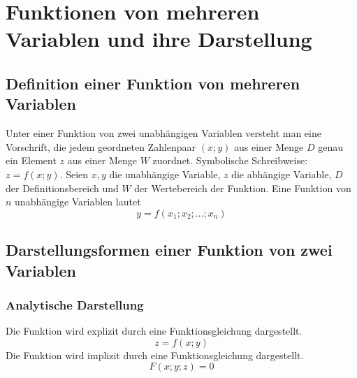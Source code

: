 \section{Funktionen von mehreren Variablen und ihre Darstellung}
\subsection{Definition einer Funktion von mehreren Variablen}
Unter einer Funktion von zwei unabhängigen Variablen versteht man eine Vorschrift, die jedem geordneten Zahlenpaar $\left(x;y\right)$ aus einer Menge $D$ genau ein Element $z$ aus einer Menge $W$ zuordnet. Symbolische Schreibweise: $z=f\left(x;y\right)$.
\newline\newline
Seien $x,y$ die unabhängige Variable, $z$ die abhängige Variable, $D$ der Definitionsbereich und $W$ der Wertebereich der Funktion. 
\newline\newline
Eine Funktion von $n$ unabhängige Variablen lautet
\begin{equation}
\boxed{y=f\left(x_1; x_2;\dotso; x_n\right)}
\end{equation}
\subsection{Darstellungsformen einer Funktion von zwei Variablen}
\subsubsection{Analytische Darstellung}
Die Funktion wird explizit durch eine Funktionsgleichung dargestellt.
\begin{equation}
\boxed{z=f\left(x;y\right)}
\end{equation}
Die Funktion wird implizit durch eine Funktionsgleichung dargestellt.
\begin{equation}
\boxed{F\left(x;y;z\right)=0}
\end{equation}
